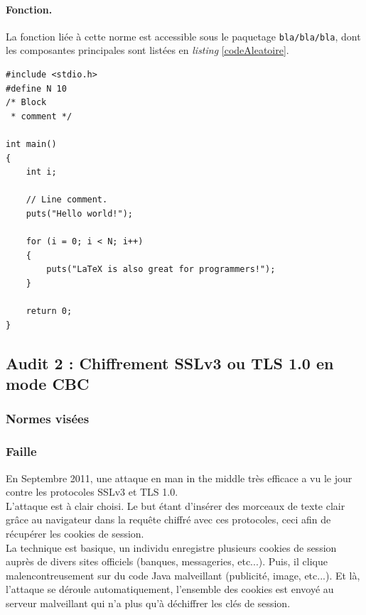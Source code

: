 			\paragraph{Fonction.\\}
			La fonction liée à cette norme est accessible sous le paquetage
			\texttt{bla/bla/bla}, dont les composantes principales sont 
			listées en \textit{listing} \ref{codeAleatoire}.
		
		
		\begin{lstlisting}[style=customc,caption=codeAleatoire.c, label=codeAleatoire]
#include <stdio.h>
#define N 10
/* Block
 * comment */
 
int main()
{
    int i;
 
    // Line comment.
    puts("Hello world!");
 
    for (i = 0; i < N; i++)
    {
        puts("LaTeX is also great for programmers!");
    }
 
    return 0;
}
		\end{lstlisting}
		
	\subsection{Audit 2 : Chiffrement SSLv3 ou TLS 1.0 en mode CBC}
		\subsubsection{Normes visées}
	
	
		\subsubsection{Faille}
			
			
			En Septembre 2011, une attaque en man in the middle très efficace
			a vu le jour contre les protocoles SSLv3 et TLS 1.0.
			\cite{ekr2011beast} \cite{imperial2011beast} \cite{goodin2011beast}
			\cite{gallagher2011beast}\\
			
			L'attaque est à clair choisi. Le but étant d'insérer des morceaux de
			texte clair grâce au navigateur dans la requête chiffré avec ces
			protocoles, ceci afin de récupérer les cookies de session.\\
			
			La technique est basique, un individu enregistre plusieurs cookies de
			session auprès de divers sites officiels (banques, messageries,
			etc...). Puis, il clique malencontreusement sur du code Java 
			malveillant (publicité, image, etc...). Et là, l'attaque se déroule
			automatiquement, l'ensemble des cookies est envoyé au serveur 
			malveillant qui n'a plus qu'à déchiffrer les clés de session.\\
			
